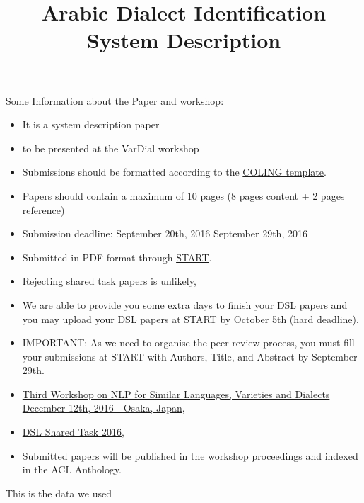 \documentclass{article}
\title{Arabic Dialect Identification System Description}
\begin{document}
Some Information about the Paper and workshop:
\begin{itemize}
\item It is a system description paper
\item to be presented at the VarDial workshop
\item Submissions should be formatted according to the \href{http://coling2016.anlp.jp}{COLING template}.
\item Papers should contain a maximum of 10 pages (8 pages content + 2 pages reference)
\item Submission deadline: September 20th, 2016 September 29th, 2016
\item Submitted in PDF format through \href{https://www.softconf.com/coling2016/VarDial3}{START}.
\item Rejecting shared task papers is unlikely,
\item We are able to provide you some extra days to finish your DSL papers and you may upload your DSL papers at START by October 5th (hard deadline).
\item IMPORTANT: As we need to organise the peer-review process, you must fill your submissions at START with Authors, Title, and Abstract by September 29th.
\item \href{http://ttg.uni-saarland.de/vardial2016/cfp.html}{Third Workshop on NLP for Similar Languages, Varieties and Dialects December 12th, 2016 - Osaka, Japan},
\item \href{http://ttg.uni-saarland.de/vardial2016/dsl2016.html}{DSL Shared Task 2016},
\item Submitted papers will be published in the workshop proceedings and indexed in the ACL Anthology.

\end{itemize}
This is the data we used \cite{Ali+2016}
\newpage


\end{document}
